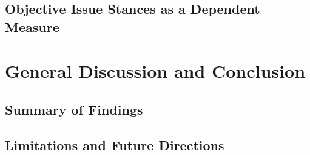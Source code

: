 \documentclass[12pt, titlepage]{article}
\begin{document}
\subsection{Objective Issue Stances as a Dependent Measure}



\section{General Discussion and Conclusion}

\subsection{Summary of Findings}


\subsection{Limitations and Future Directions}

\clearpage


\appendixtitleon
\appendixtitletocon
\end{document}
